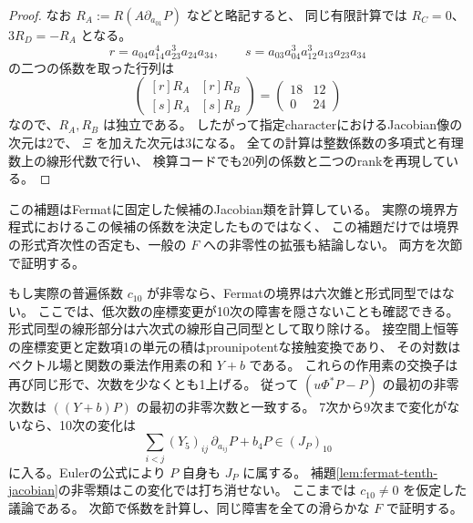 \begin{proof}
なお $R_A:=R(A\partial_{a_{01}}P)$ などと略記すると、
同じ有限計算では $R_C=0$、$3R_D=-R_A$ となる。
\[
 r=a_{04}a_{14}^4a_{23}^3a_{24}a_{34},\qquad
 s=a_{03}a_{04}^3a_{12}^3a_{13}a_{23}a_{34}
\]
の二つの係数を取った行列は
\[
 \begin{pmatrix}{[r]R_A} &{[r]R_B}\\{[s]R_A} &{[s]R_B}\end{pmatrix}
                  =\begin{pmatrix}18&12\\0&24\end{pmatrix}
\]
なので、$R_A,R_B$ は独立である。
したがって指定characterにおけるJacobian像の次元は2で、
$\Xi$ を加えた次元は3になる。
全ての計算は整数係数の多項式と有理数上の線形代数で行い、
検算コードでも20列の係数と二つのrankを再現している。
\end{proof}

\begin{remark}[実際の境界の係数は別の問題]
この補題はFermatに固定した候補のJacobian類を計算している。
実際の境界方程式におけるこの候補の係数を決定したものではなく、
この補題だけでは境界の形式斉次性の否定も、一般の $F$ への非零性の拡張も結論しない。
両方を次節で証明する。
\end{remark}

\begin{remark}[係数が非零なら生じる形式的障害]
もし実際の普遍係数 $c_{10}$ が非零なら、Fermatの境界は六次錐と形式同型ではない。
ここでは、低次数の座標変更が10次の障害を隠さないことも確認できる。
形式同型の線形部分は六次式の線形自己同型として取り除ける。
接空間上恒等の座標変更と定数項1の単元の積はprounipotentな接触変換であり、
その対数はベクトル場と関数の乗法作用素の和 $Y+b$ である。
これらの作用素の交換子は再び同じ形で、次数を少なくとも1上げる。
従って $(u\Phi^*P-P)$ の最初の非零次数は $((Y+b)P)$ の最初の非零次数と一致する。
7次から9次まで変化がないなら、10次の変化は
\[
       \sum_{i<j}(Y_5)_{ij}\,\partial_{a_{ij}}P+b_4P
                         \in(J_P)_{10}
\]
に入る。Eulerの公式により $P$ 自身も $J_P$ に属する。
補題\ref{lem:fermat-tenth-jacobian}の非零類はこの変化では打ち消せない。
ここまでは $c_{10}\ne0$ を仮定した議論である。
次節で係数を計算し、同じ障害を全ての滑らかな $F$ で証明する。
\end{remark}

\clearpage
